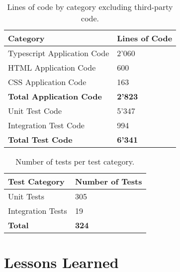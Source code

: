 \begin{table}[H]
    \begin{tabu}{X l}
        \toprule
        \textbf{Category}
        & \textbf{Lines of Code}\\
        \midrule

        Typescript Application Code
        & 2'060 \\

        HTML Application Code
        & 600 \\

        CSS Application Code
        & 163 \\
        \midrule
        \textbf{Total Application Code}
        & \textbf{2'823} \\
        \midrule

        Unit Test Code
        & 5'347 \\

        Integration Test Code
        & 994 \\

        \midrule
        \textbf{Total Test Code}
        & \textbf{6'341} \\
        \midrule

    \end{tabu}
    \caption{Lines of code by category excluding third-party code.}
    \label{tab:lines-of-code}
\end{table}

\begin{table}[H]
    \begin{tabu}{X l}
        \toprule
        \textbf{Test Category}
        & \textbf{Number of Tests}\\
        \midrule

        Unit Tests
        & 305 \\

        Integration Tests
        & 19 \\

        \midrule
        \textbf{Total}
        & \textbf{324} \\
        \midrule
    \end{tabu}
    \caption{Number of tests per test category.}
    \label{tab:no-of-tests}
\end{table}

\section{Lessons Learned}

